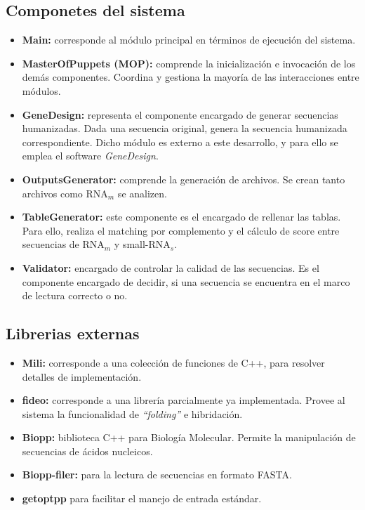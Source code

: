 \documentclass[12pt,a4paper,spanish]{article}
\begin{document}
\subsection{Componetes del sistema}
   \begin{itemize}
      \item \textbf{Main:} corresponde al módulo principal en términos de ejecución del sistema.

      \item \textbf{MasterOfPuppets (MOP):}  comprende la inicialización e invocación de los demás
      componentes. Coordina y gestiona la mayoría de las interacciones entre módulos.
    
      \item \textbf{GeneDesign:} representa el componente encargado de generar secuencias humanizadas. Dada
      una secuencia original, genera la secuencia humanizada correspondiente. Dicho módulo es externo a este
      desarrollo, y para ello se emplea el software \emph{GeneDesign}.

      \item \textbf{OutputsGenerator:} comprende la generación de archivos. Se crean tanto archivos como 
      RNA$_m$ se analizen.

      \item \textbf{TableGenerator:} este componente es el encargado de rellenar las tablas. Para ello,
      realiza el matching por complemento y el cálculo de score entre secuencias de RNA$_m$ y small-RNA$_s$. 

      \item \textbf{Validator:} encargado de controlar la calidad de las secuencias. Es el componente
      encargado de decidir, si una secuencia se encuentra en el marco de lectura correcto o no.              
   \end{itemize}

\subsection{Librerias externas}
\begin{itemize}
    \item \textbf{Mili:} corresponde a una colección de funciones de C++, para resolver detalles de
     implementación.

    \item \textbf{fideo:} corresponde a una librería parcialmente ya implementada. Provee al sistema la
     funcionalidad de \emph{``folding''} e hibridación. 

    \item \textbf{Biopp:} biblioteca C++ para Biología Molecular. Permite la manipulación de secuencias de
    ácidos nucleicos.  

    \item \textbf{Biopp-filer:} para la lectura de secuencias en formato FASTA.    

    \item \textbf{getoptpp} para facilitar el manejo de entrada estándar.
\end{itemize}
\end{document}
